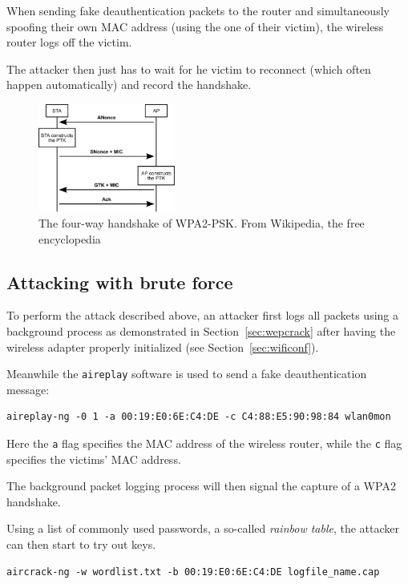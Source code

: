 When sending fake deauthentication packets to the router and simultaneously spoofing their own MAC address (using the one of their victim), the wireless router logs off the victim.

The attacker then just has to wait for he victim to reconnect (which often happen automatically) and record the handshake.

\begin{figure}
\includegraphics[width=0.4\textwidth]{src/img/4-way-handshake.png}
\caption{The four-way handshake of WPA2-PSK\@. From Wikipedia, the free encyclopedia~\cite{Mikm07}}\label{fig:wpa2fway}
\end{figure}

\subsection{Attacking with brute force}\label{sec:wpa2brute}

To perform the attack described above, an attacker first logs all packets using a background process as demonstrated in Section~\ref{sec:wepcrack} after having the wireless adapter properly initialized (see Section~\ref{sec:wificonf}).

Meanwhile the \lstinline{aireplay} software is used to send a fake deauthentication message:

\begin{lstlisting}
aireplay-ng -0 1 -a 00:19:E0:6E:C4:DE -c C4:88:E5:90:98:84 wlan0mon
\end{lstlisting}

Here the \lstinline{a} flag specifies the MAC address of the wireless router, while the \lstinline{c} flag specifies the victims' MAC address.

The background packet logging process will then signal the capture of a WPA2 handshake.

Using a list of commonly used passwords, a so-called \emph{rainbow table}, the attacker can then start to try out keys.

\begin{lstlisting}
aircrack-ng -w wordlist.txt -b 00:19:E0:6E:C4:DE logfile_name.cap
\end{lstlisting}

